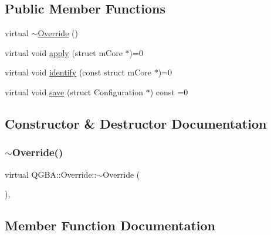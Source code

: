 \subsection*{Public Member Functions}
\begin{DoxyCompactItemize}
\item 
virtual \mbox{\hyperlink{class_q_g_b_a_1_1_override_aaeee7e8ab7d411d1c90ce3eec6f703ad}{$\sim$\+Override}} ()
\item 
virtual void \mbox{\hyperlink{class_q_g_b_a_1_1_override_af7d6d72e9344c21b6133a18240ac0935}{apply}} (struct m\+Core $\ast$)=0
\item 
virtual void \mbox{\hyperlink{class_q_g_b_a_1_1_override_aac1ad966769d5424736654fdc69a3725}{identify}} (const struct m\+Core $\ast$)=0
\item 
virtual void \mbox{\hyperlink{class_q_g_b_a_1_1_override_aa03c9614ec596b7e2fb15e59483fb99e}{save}} (struct Configuration $\ast$) const =0
\end{DoxyCompactItemize}


\subsection{Constructor \& Destructor Documentation}
\mbox{\label{class_q_g_b_a_1_1_override_aaeee7e8ab7d411d1c90ce3eec6f703ad}} 
\subsubsection{\texorpdfstring{$\sim$\+Override()}{~Override()}}
{\footnotesize\ttfamily virtual Q\+G\+B\+A\+::\+Override\+::$\sim$\+Override (\begin{DoxyParamCaption}{ }\end{DoxyParamCaption})\hspace{0.3cm}{\ttfamily [inline]}, {\ttfamily [virtual]}}



\subsection{Member Function Documentation}
\mbox{\label{class_q_g_b_a_1_1_override_af7d6d72e9344c21b6133a18240ac0935}} 
